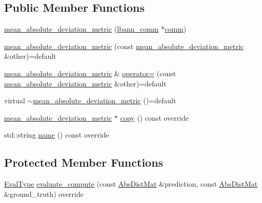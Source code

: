 \subsection*{Public Member Functions}
\begin{DoxyCompactItemize}
\item 
\hyperlink{classlbann_1_1mean__absolute__deviation__metric_afb98a53d7a6f0981d80f5c74fd6ce25a}{mean\+\_\+absolute\+\_\+deviation\+\_\+metric} (\hyperlink{classlbann_1_1lbann__comm}{lbann\+\_\+comm} $\ast$\hyperlink{file__io_8cpp_ab048c6f9fcbcfaa57ce68b00263dbebe}{comm})
\item 
\hyperlink{classlbann_1_1mean__absolute__deviation__metric_a15c988cd4a265d050eaf6b9c424c3683}{mean\+\_\+absolute\+\_\+deviation\+\_\+metric} (const \hyperlink{classlbann_1_1mean__absolute__deviation__metric}{mean\+\_\+absolute\+\_\+deviation\+\_\+metric} \&other)=default
\item 
\hyperlink{classlbann_1_1mean__absolute__deviation__metric}{mean\+\_\+absolute\+\_\+deviation\+\_\+metric} \& \hyperlink{classlbann_1_1mean__absolute__deviation__metric_a7424749c8ab06a2126485c9dba202b8f}{operator=} (const \hyperlink{classlbann_1_1mean__absolute__deviation__metric}{mean\+\_\+absolute\+\_\+deviation\+\_\+metric} \&other)=default
\item 
virtual \hyperlink{classlbann_1_1mean__absolute__deviation__metric_a78ec4ab5b31f87ffd2ceb9589a3a0089}{$\sim$mean\+\_\+absolute\+\_\+deviation\+\_\+metric} ()=default
\item 
\hyperlink{classlbann_1_1mean__absolute__deviation__metric}{mean\+\_\+absolute\+\_\+deviation\+\_\+metric} $\ast$ \hyperlink{classlbann_1_1mean__absolute__deviation__metric_ad49148043214908a671799bcdd0b120b}{copy} () const override
\item 
std\+::string \hyperlink{classlbann_1_1mean__absolute__deviation__metric_a6b2f0542a991b632414dc217586db905}{name} () const override
\end{DoxyCompactItemize}
\subsection*{Protected Member Functions}
\begin{DoxyCompactItemize}
\item 
\hyperlink{base_8hpp_a3266f5ac18504bbadea983c109566867}{Eval\+Type} \hyperlink{classlbann_1_1mean__absolute__deviation__metric_a4096a6f389b2f18ff6c19428313f2969}{evaluate\+\_\+compute} (const \hyperlink{base_8hpp_a9a697a504ae84010e7439ffec862b470}{Abs\+Dist\+Mat} \&prediction, const \hyperlink{base_8hpp_a9a697a504ae84010e7439ffec862b470}{Abs\+Dist\+Mat} \&ground\+\_\+truth) override
\end{DoxyCompactItemize}


